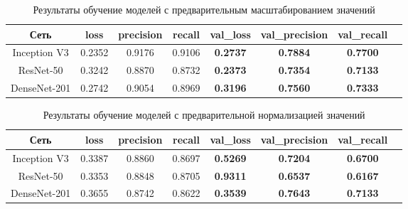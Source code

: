 \begin{table}[H]
    \centering
    \caption{Результаты обучение моделей с предварительным масштабированием значений} \label{rescale}
    \begin{tabular}{|c|c|c|c|c|c|c|c|}
        \hline    
        Сеть          & loss   & precision & recall &\textbf{val\_loss} & \textbf{val\_precision} & \textbf{val\_recall} \\ %
        \hline
        Inception V3  & 0.2352 & 0.9176    & 0.9106 & \textbf{0.2737}   & \color{red}\textbf{0.7884}        & \color{red}\textbf{0.7700} \\ %
        \hline
        ResNet-50     & 0.3242 & 0.8870    & 0.8732 & \color{red}\textbf{0.2373}    & \textbf{0.7354}         & \textbf{0.7133} \\ %
        \hline
        DenseNet-201  & 0.2742 & 0.9054    & 0.8969 & \textbf{0.3196}    & \textbf{0.7560}         & \textbf{0.7333} \\ %
        \hline
      \end{tabular}
\end{table}

\begin{table}[H]
    \centering
    \caption{Результаты обучение моделей с предварительной нормализацией значений} \label{samplewise}    
    \begin{tabular}{|c|c|c|c|c|c|c|c|}
        \hline    
        Сеть          & loss   & precision & recall & \textbf{val\_loss} & \textbf{val\_precision} & \textbf{val\_recall} \\ %
        \hline
        Inception V3  & 0.3387 & 0.8860    & 0.8697 & \textbf{0.5269}    & \textbf{0.7204}         & \textbf{0.6700} \\ %
        \hline
        ResNet-50     & 0.3353  & 0.8848   & 0.8705 & \textbf{0.9311}   & \textbf{0.6537}        & \textbf{0.6167} \\ %
        \hline
        DenseNet-201  & 0.3655  & 0.8742   & 0.8622 & \textbf{0.3539}   & \textbf{0.7643}        & \textbf{0.7133} \\ %
        \hline
      \end{tabular}
\end{table}




